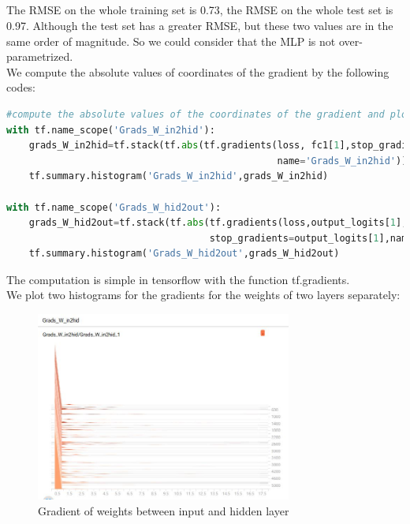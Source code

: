\documentclass{article}
\begin{document}
\subsection{}The RMSE on the whole training set is 0.73, the RMSE on the whole test set is 0.97. Although the test set has a greater RMSE, but these two values are in the same order of magnitude. So we could consider that the MLP is not over-parametrized.\\
We compute the absolute values of coordinates of the gradient by the following codes:
\begin{lstlisting}[language=Python]
#compute the absolute values of the coordinates of the gradient and plot the histograms
with tf.name_scope('Grads_W_in2hid'):
    grads_W_in2hid=tf.stack(tf.abs(tf.gradients(loss, fc1[1],stop_gradients=fc1[1],
                                                name='Grads_W_in2hid')))
    tf.summary.histogram('Grads_W_in2hid',grads_W_in2hid)

with tf.name_scope('Grads_W_hid2out'):
    grads_W_hid2out=tf.stack(tf.abs(tf.gradients(loss,output_logits[1],
                                    stop_gradients=output_logits[1],name='Grads_W_hid2out')))
    tf.summary.histogram('Grads_W_hid2out',grads_W_hid2out)
\end{lstlisting}
The computation is simple in tensorflow with the function tf.gradients.\\
We plot two histograms for the gradients for the weights of two layers separately:
  \begin{figure}[H]
  \centering
  \includegraphics[width=0.75\textwidth]{G_W_in2hid.jpg}
  \caption{Gradient of weights between input and hidden layer}\label{}
  \end{figure}
\end{document}
